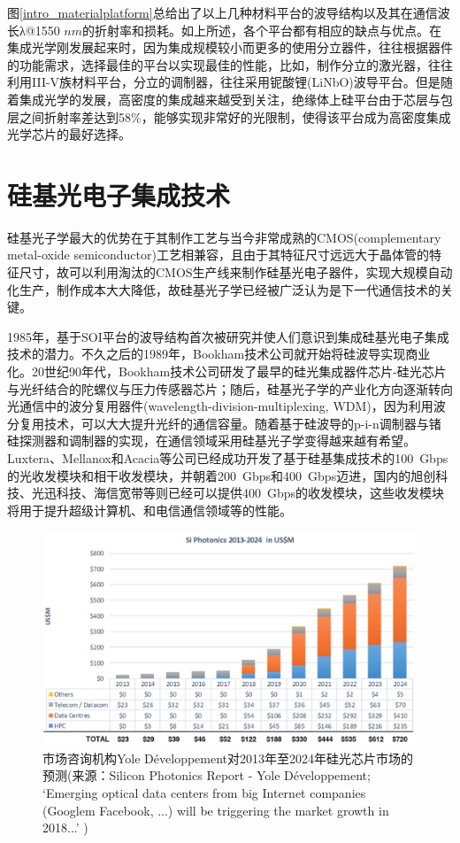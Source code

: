 图\ref{intro_materialplatform}总给出了以上几种材料平台的波导结构以及其在通信波长λ@1550 $nm$的折射率和损耗。如上所述，各个平台都有相应的缺点与优点。在集成光学刚发展起来时，因为集成规模较小而更多的使用分立器件，往往根据器件的功能需求，选择最佳的平台以实现最佳的性能，比如，制作分立的激光器，往往利用III-V族材料平台，分立的调制器，往往采用铌酸锂(LiNbO)波导平台。但是随着集成光学的发展，高密度的集成越来越受到关注，绝缘体上硅平台由于芯层与包层之间折射率差达到58\%，能够实现非常好的光限制，使得该平台成为高密度集成光学芯片的最好选择。

\section{硅基光电子集成技术}

硅基光子学最大的优势在于其制作工艺与当今非常成熟的CMOS(complementary metal-oxide semiconductor)工艺相兼容，且由于其特征尺寸远远大于晶体管的特征尺寸，故可以利用淘汰的CMOS生产线来制作硅基光电子器件，实现大规模自动化生产，制作成本大大降低，故硅基光子学已经被广泛认为是下一代通信技术的关键。

1985年，基于SOI平台的波导结构首次被研究并使人们意识到集成硅基光电子集成技术的潜力\cite{soref1985single,reed2005silicon}。不久之后的1989年，Bookham技术公司就开始将硅波导实现商业化。20世纪90年代，Bookham技术公司研发了最早的硅光集成器件芯片-硅光芯片与光纤结合的陀螺仪与压力传感器芯片\cite{rickman2014commercialization}；随后，硅基光子学的产业化方向逐渐转向光通信中的波分复用器件(wavelength-division-multiplexing, WDM)，因为利用波分复用技术，可以大大提升光纤的通信容量。随着基于硅波导的p-i-n调制器与锗硅探测器和调制器的实现\cite{liu2005tensile,feng2014micron}，在通信领域采用硅基光子学变得越来越有希望。Luxtera、Mellanox和Acacia等公司已经成功开发了基于硅基集成技术的100~Gbps的光收发模块和相干收发模块，并朝着200~Gbps和400~Gbps迈进\cite{boeuf2015recent,feng2014micron,doerr2014single}，国内的旭创科技、光迅科技、海信宽带等则已经可以提供400~Gbps的收发模块，这些收发模块将用于提升超级计算机、和电信通信领域等的性能。

\begin{figure}[htb]
	\centering
	\includegraphics[width=14cm]{./Pictures/intro_siliconphotonicsmarket.jpg}
	\captionsetup{justification=centering}
	\caption{市场咨询机构Yole Développement对2013年至2024年硅光芯片市场的预测(来源：Silicon Photonics Report - Yole Développement; ‘Emerging optical data centers from big Internet companies (Googlem Facebook, ...) will be triggering the market growth in 2018...’ )}
	\label{intro_siliconphotonicsmarket}
\end{figure}

